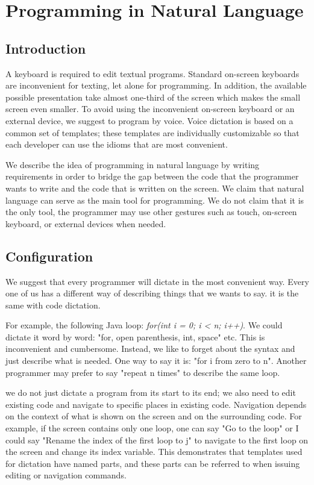 \chapter{Programming in Natural Language} \label{chapter: Programming in Natural Language}
\section{Introduction}
A keyboard is required to edit textual programs. Standard on-screen keyboards are inconvenient for texting, let alone for programming. In addition, the available possible presentation take almost one-third of the screen which makes the small screen even smaller. To avoid using the inconvenient on-screen keyboard or an external device, we suggest to program by voice. Voice dictation is based on a common set of templates; these templates are individually customizable so that each developer can use the idioms that are most convenient.

We describe the idea of programming in natural language by writing requirements in order to bridge the gap between the code that the programmer wants to write and the code that is written on the screen. We claim that natural language can serve as the main tool for programming. We do not claim that it is the only tool, the programmer may use other gestures such as touch, on-screen keyboard, or external devices when needed.
\section{Configuration}
We suggest that every programmer will dictate in the most convenient way. Every one of us has a different way of describing things that we wants to say. it is the same with code dictation.

For example, the following Java loop: \textit{for(int i = 0; i < n; i++)}. We could dictate it word by word: "for, open parenthesis, int, space" etc. This is inconvenient and cumbersome. Instead, we like to forget about the syntax and just describe what is needed. One way to say it is: "for i from zero to n". Another programmer may prefer to say "repeat n times" to describe the same loop.

we do not just dictate a program from its start to its end; we also need to edit existing code and navigate to specific places in existing code. Navigation depends on the context of what is shown on the screen and on the surrounding code. For example, if the screen contains only one loop, one can say "Go to the loop" or I could say "Rename the index of the first loop to j" to navigate to the first loop on the screen and change its index variable. This demonstrates that templates used for dictation have named parts, and these parts can be referred to when issuing editing or navigation commands.
